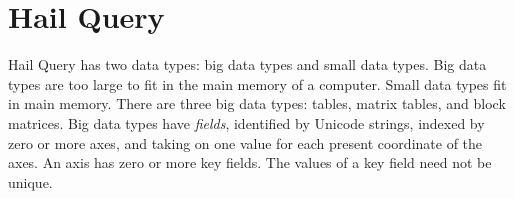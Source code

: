 \documentclass[sigconf, nonacm]{acmart}
\begin{document}









\section{Hail Query}

Hail Query has two data types: big data types and small data types. Big data types are too large to
fit in the main memory of a computer. Small data types fit in main memory. There are three big data
types: tables, matrix tables, and block matrices. Big data types have \emph{fields}, identified by
Unicode strings, indexed by zero or more axes, and taking on one value for each present coordinate
of the axes. An axis has zero or more key fields. The values of a key field need not be
unique.
\end{document}
